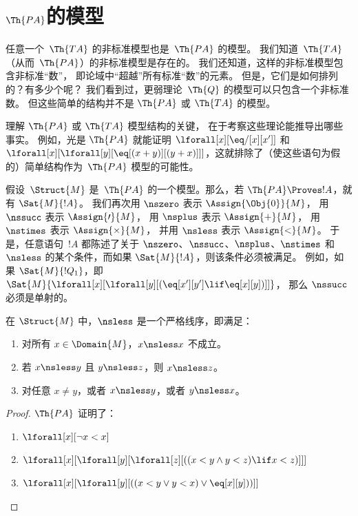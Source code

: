 \documentclass[../../../include/open-logic-section]{subfiles}
\begin{document}
\section{$\Th{PA}$的模型}


\begin{explain}
任意一个~$\Th{TA}$ 的非标准模型也是~$\Th{PA}$ 的模型。
我们知道~$\Th{TA}$（从而~$\Th{PA}$）的非标准模型是存在的。
我们还知道，这样的非标准模型包含非标准“数”，
即论域中“超越”所有标准“数”的元素。
但是，它们是如何排列的？有多少个呢？
我们看到过，更弱理论~$\Th{Q}$ 的模型可以只包含一个非标准数。
但这些简单的结构并不是 $\Th{PA}$ 或 $\Th{TA}$ 的模型。

理解 $\Th{PA}$ 或 $\Th{TA}$ 模型结构的关键，
在于考察这些理论能推导出哪些事实。
例如，光是 $\Th{PA}$ 就能证明 $\lforall[x][\eq/[x][x']]$
和 $\lforall[x][\lforall[y][\eq[(x+y)][(y+x)]]]$，这就排除了（使这些语句为假的）简单结构作为~$\Th{PA}$ 模型的可能性。

假设~$\Struct{M}$ 是~$\Th{PA}$ 的一个模型。那么，若 $\Th{PA} \Proves !A$，就有 $\Sat{M}{!A}$。
我们再次用 $\nszero$ 表示 $\Assign{\Obj{0}}{M}$，
用 $\nssucc$ 表示 $\Assign{\prime}{M}$，
用 $\nsplus$ 表示 $\Assign{+}{M}$，
用 $\nstimes$ 表示 $\Assign{\times}{M}$，
并用 $\nsless$ 表示 $\Assign{<}{M}$。
于是，任意语句~$!A$ 都陈述了关于 $\nszero$、$\nssucc$、$\nsplus$、$\nstimes$ 和 $\nsless$ 的某个条件，而如果 $\Sat{M}{!A}$，则该条件必须被满足。
例如，如果 $\Sat{M}{!Q_1}$，即
$\Sat{M}{\lforall[x][\lforall[y][(\eq[x'][y'] \lif \eq[x][y])]]}$，
那么 $\nssucc$ 必须是单射的。
\end{explain}

\begin{prop}
在 $\Struct{M}$ 中，$\nsless$ 是一个严格线序，即满足：
\begin{enumerate}
\item 对所有 $x \in \Domain{M}$，$x \nsless x$ 不成立。
\item 若 $x \nsless y$ 且 $y \nsless z$，则 $x \nsless z$。
\item 对任意 $x \neq y$，或者 $x \nsless y$，或者 $y \nsless x$。
\end{enumerate}
\end{prop}

\begin{proof}
$\Th{PA}$ 证明了：
\begin{enumerate}
\item $\lforall[x][\lnot x < x]$
\item $\lforall[x][\lforall[y][\lforall[z][((x < y \land y < z) \lif x < z)]]]$
\item $\lforall[x][\lforall[y][((x < y \lor y < x) \lor \eq[x][y]))]]$
\end{enumerate}
\end{proof}
\end{document}
